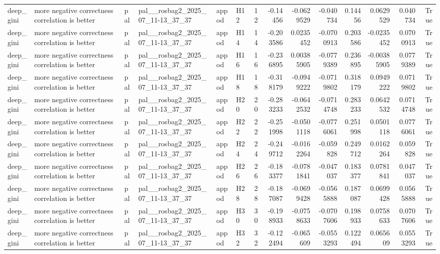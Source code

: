 \begin{longtable}{llllllrrrrrrrr}
deep\_gini & more negative correctness correlation is better & pal & pal\_\_rosbag2\_2025\_07\_11-13\_37\_37 & appod & H12 & 12 & -0.14456 & -0.0629529 & -0.040734 & 0.14456 & 0.0629529 & 0.040734 & True \\
deep\_gini & more negative correctness correlation is better & pal & pal\_\_rosbag2\_2025\_07\_11-13\_37\_37 & appod & H14 & 14 & -0.203586 & 0.0235452 & -0.0700913 & 0.203586 & -0.0235452 & 0.0700913 & True \\
deep\_gini & more negative correctness correlation is better & pal & pal\_\_rosbag2\_2025\_07\_11-13\_37\_37 & appod & H16 & 16 & -0.236895 & 0.00385905 & -0.0779389 & 0.236895 & -0.00385905 & 0.0779389 & True \\
deep\_gini & more negative correctness correlation is better & pal & pal\_\_rosbag2\_2025\_07\_11-13\_37\_37 & appod & H18 & 18 & -0.318179 & -0.0949222 & -0.0719802 & 0.318179 & 0.0949222 & 0.0719802 & True \\
deep\_gini & more negative correctness correlation is better & pal & pal\_\_rosbag2\_2025\_07\_11-13\_37\_37 & appod & H20 & 20 & -0.283233 & -0.0642532 & -0.0714748 & 0.283233 & 0.0642532 & 0.0714748 & True \\
deep\_gini & more negative correctness correlation is better & pal & pal\_\_rosbag2\_2025\_07\_11-13\_37\_37 & appod & H22 & 22 & -0.251998 & -0.0501118 & -0.0776061 & 0.251998 & 0.0501118 & 0.0776061 & True \\
deep\_gini & more negative correctness correlation is better & pal & pal\_\_rosbag2\_2025\_07\_11-13\_37\_37 & appod & H24 & 24 & -0.249712 & -0.0162264 & -0.059828 & 0.249712 & 0.0162264 & 0.059828 & True \\
deep\_gini & more negative correctness correlation is better & pal & pal\_\_rosbag2\_2025\_07\_11-13\_37\_37 & appod & H26 & 26 & -0.183377 & -0.0781841 & -0.047037 & 0.183377 & 0.0781841 & 0.047037 & True \\
deep\_gini & more negative correctness correlation is better & pal & pal\_\_rosbag2\_2025\_07\_11-13\_37\_37 & appod & H28 & 28 & -0.187087 & -0.0699428 & -0.0565888 & 0.187087 & 0.0699428 & 0.0565888 & True \\
deep\_gini & more negative correctness correlation is better & pal & pal\_\_rosbag2\_2025\_07\_11-13\_37\_37 & appod & H30 & 30 & -0.198933 & -0.0758633 & -0.0707606 & 0.198933 & 0.0758633 & 0.0707606 & True \\
deep\_gini & more negative correctness correlation is better & pal & pal\_\_rosbag2\_2025\_07\_11-13\_37\_37 & appod & H32 & 32 & -0.122494 & -0.065609 & -0.0553293 & 0.122494 & 0.065609 & 0.0553293 & True \\

\end{longtable}
